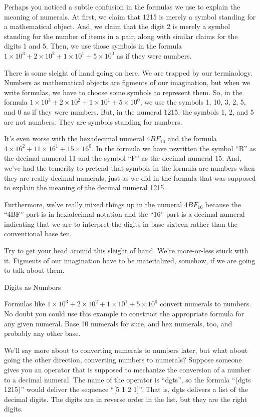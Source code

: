 \begin{aside}
Perhaps you noticed a subtle confusion in the formulas we use
to explain the meaning of numerals. At first, we claim that
1215 is merely a symbol standing for a mathematical object.
And, we claim that the digit 2 is merely a symbol standing
for the number of items in a pair, along with similar
claims for the digits 1 and 5. Then, we use those symbols
in the formula $1 \times 10^3 + 2 \times 10^2 + 1 \times 10^1 + 5 \times 10^0$
as if they were numbers.

There is some sleight of hand going on here.
We are trapped by our terminology.
Numbers as mathematical objects are figments of our imagination,
but when we write formulas, we have to choose some symbols to
represent them.
So, in the formula $1 \times 10^3 + 2 \times 10^2 + 1 \times 10^1 + 5 \times 10^0$,
we use the symbols 1, 10, 3, 2, 5, and 0 as if they were numbers.
But, in the numeral 1215, the symbols 1, 2, and 5 are not numbers.
They are symbols standing for numbers.

It's even worse with the hexadecimal numeral $4BF_{16}$
and the formula $4 \times 16^2 + 11 \times 16^1 + 15 \times 16^0$.
In the formula we have rewritten the symbol ``B'' as the decimal numeral 11
and the symbol ``F'' as the decimal numeral 15.
And, we've had the temerity to pretend that symbols
in the formula are numbers when they are really decimal numerals,
just as we did in the formula that was supposed to explain
the meaning of the decimal numeral 1215.

Furthermore, we've really mixed things up in the numeral
$4BF_{16}$ because the ``4BF'' part is in hexadecimal notation
and the ``16'' part is a decimal numeral indicating that we are
to interpret the digits in base sixteen rather than the conventional base ten.

Try to get your head around this sleight of hand.
We're more-or-less stuck with it. Figments of our imagination have
to be materialized, somehow, if we are going to talk about them.
\caption{Digits as Numbers}
\label{aside-digits-as-numbers}
\end{aside}


Formulas like $1 \times 10^3 + 2 \times 10^2 + 1 \times 10^1 + 5 \times 10^0$
convert numerals to numbers.
No doubt you could use this example to construct the appropriate formula
for any given numeral. Base 10 numerals for sure, and hex numerals, too,
and probably any other base.

We'll say more about to converting numerals to numbers later,
but what about going the other direction, converting
numbers to numerals?
Suppose someone gives you an operator that is supposed to
mechanize the conversion of a number to a decimal numeral.
The name of the operator is ``dgts'', so the formula
``(dgts 1215)'' would deliver the sequence ``[5 1 2 1]''.
That is, dgts delivers a list of the decimal digits.
The digits are in reverse order in the list,
but they are the right digits.

